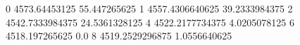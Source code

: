 0 4573.64453125 55.447265625
1 4557.4306640625 39.2333984375
2 4542.7333984375 24.5361328125
4 4522.2177734375 4.0205078125
6 4518.197265625 0.0
8 4519.2529296875 1.0556640625
